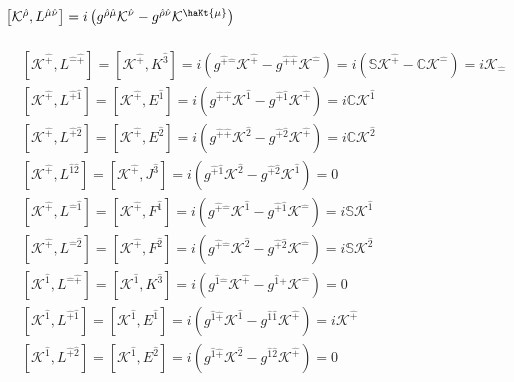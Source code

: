 \documentclass[]{article}
\numberwithin{equation}{section}
\begin{document}
\section{$\left[\mathcal{K}^{\hat{\rho}},L^{\hat{\mu}\hat{\nu}}\right]=i\left(g^{\hat{\rho}\hat{\mu}}\mathcal{K}^{\hat{\nu}}-g^{\hat{\rho}\hat{\nu}}\mathcal{K}^{\haKt{\mu}}\right)$}
\begin{align}
    &\left[\mathcal{K}^{\hat{+}},L^{\hat{-}\hat{+}}\right]=\left[\mathcal{K}^{\hat{+}},{K}^\hat{3}\right]=i\left(g^{\hat{+}\hat{-}}\mathcal{K}^{\hat{+}}-g^{\hat{+}\hat{+}}\mathcal{K}^{\hat{-}}\right)=i\left(\mathbb{S}\mathcal{K}^{\hat{+}}-\mathbb{C}\mathcal{K}^{\hat{-}}\right)=i\mathcal{K}_{\hat{-}}\\
    &\left[\mathcal{K}^{\hat{+}},L^{\hat{+}\hat{1}}\right]=\left[\mathcal{K}^{\hat{+}},E^{\hat{1}}\right]=i\left(g^{\hat{+}\hat{+}}\mathcal{K}^{\hat{1}}-g^{\hat{+}\hat{1}}\mathcal{K}^{\hat{+}}\right)=i\mathbb{C}\mathcal{K}^{\hat{1}}\\
    &\left[\mathcal{K}^{\hat{+}},L^{\hat{+}\hat{2}}\right]=\left[\mathcal{K}^{\hat{+}},E^{\hat{2}}\right]=i\left(g^{\hat{+}\hat{+}}\mathcal{K}^{\hat{2}}-g^{\hat{+}\hat{2}}\mathcal{K}^{\hat{+}}\right)=i\mathbb{C}\mathcal{K}^{\hat{2}}\\
    &\left[\mathcal{K}^{\hat{+}},L^{\hat{1}\hat{2}}\right]=\left[\mathcal{K}^{\hat{+}},J^{\hat{3}}\right]=i\left(g^{\hat{+}\hat{1}}\mathcal{K}^{\hat{2}}-g^{\hat{+}\hat{2}}\mathcal{K}^{\hat{1}}\right)=0\\
    &\left[\mathcal{K}^{\hat{+}},L^{\hat{-}\hat{1}}\right]=\left[\mathcal{K}^{\hat{+}},F^{\hat{1}}\right]=i\left(g^{\hat{+}\hat{-}}\mathcal{K}^{\hat{1}}-g^{\hat{+}\hat{1}}\mathcal{K}^{\hat{-}}\right)=i\mathbb{S}\mathcal{K}^{\hat{1}}\\
    &\left[\mathcal{K}^{\hat{+}},L^{\hat{-}\hat{2}}\right]=\left[\mathcal{K}^{\hat{+}},F^{\hat{2}}\right]=i\left(g^{\hat{+}\hat{-}}\mathcal{K}^{\hat{2}}-g^{\hat{+}\hat{2}}\mathcal{K}^{\hat{-}}\right)=i\mathbb{S}\mathcal{K}^{\hat{2}}\\
    &\left[\mathcal{K}^{\hat{1}},L^{\hat{-}\hat{+}}\right]=\left[\mathcal{K}^{\hat{1}},K^{\hat{3}}\right]=i\left(g^{\hat{1}\hat{-}}\mathcal{K}^{\hat{+}}-g^{\hat{1}\hat{+}}\mathcal{K}^{\hat{-}}\right)=0\\
    &\left[\mathcal{K}^{\hat{1}},L^{\hat{+}\hat{1}}\right]=\left[\mathcal{K}^{\hat{1}},E^{\hat{1}}\right]=i\left(g^{\hat{1}\hat{+}}\mathcal{K}^{\hat{1}}-g^{\hat{1}\hat{1}}\mathcal{K}^{\hat{+}}\right)=i\mathcal{K}^{\hat{+}}\\
    &\left[\mathcal{K}^{\hat{1}},L^{\hat{+}\hat{2}}\right]=\left[\mathcal{K}^{\hat{1}},E^{\hat{2}}\right]=i\left(g^{\hat{1}\hat{+}}\mathcal{K}^{\hat{2}}-g^{\hat{1}\hat{2}}\mathcal{K}^{\hat{+}}\right)=0\\

\end{align}
\end{document}

